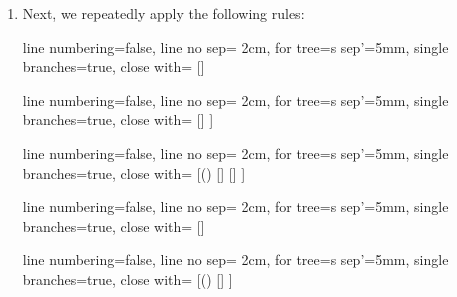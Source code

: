 \begin{enumerate}[\thesection.1]
\begin{enumerate}[1.]
\begin{itemize}
					\begin{prooftree}
					{
					line numbering=false,
					line no sep= 2cm,
					for tree={s sep'=5mm},
					single branches=true,
					close with=\xmark
					}
					[p\land q, grouped [ \neg p\lor q, grouped [\neg (q\land \neg \neg r), grouped ] ] ]
					\end{prooftree}
					

			\end{itemize}
			
		\item Next, we repeatedly apply the following rules: 
					
					\vspace{2ex}
				
					\begin{center}
					
					\begin{prooftree}
					{
					line numbering=false,
					line no sep= 2cm,
					for tree={s sep'=5mm},
					single branches=true,
					close with=\xmark
					}
					[\neg\neg \phi [\phi ] ]
					\end{prooftree}
					\begin{prooftree}
					{
					line numbering=false,
					line no sep= 2cm,
					for tree={s sep'=5mm},
					single branches=true,
					close with=\xmark
					}
					[\phi\land\psi [\phi [\psi ] ] ]
					\end{prooftree}
					\begin{prooftree}
					{
					line numbering=false,
					line no sep= 2cm,
					for tree={s sep'=5mm},
					single branches=true,
					close with=\xmark
					}
					[\neg (\phi\land\psi) [\neg \phi ] [\neg \psi ] ]
					\end{prooftree}
					\begin{prooftree}
					{
					line numbering=false,
					line no sep= 2cm,
					for tree={s sep'=5mm},
					single branches=true,
					close with=\xmark
					}
					[\phi\lor\psi [\phi ] [\psi ] ]
					\end{prooftree}
					\begin{prooftree}
					{
					line numbering=false,
					line no sep= 2cm,
					for tree={s sep'=5mm},
					single branches=true,
					close with=\xmark
					}
					[\neg(\phi\lor\psi) [\neg\phi [\neg\psi ] ] ]
					\end{prooftree}

					\vspace{2ex}


\end{center}
\end{enumerate}
\end{enumerate}
